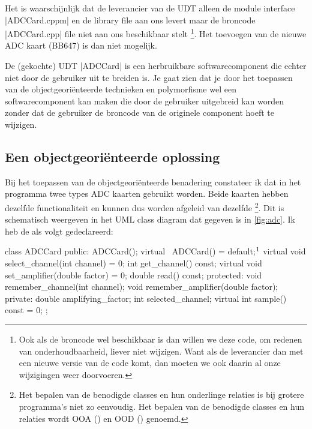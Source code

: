 \begin{cpplstShortInline}
Het is waarschijnlijk dat de leverancier van de UDT alleen de module interface |ADCCard.cppm| en de library file  aan ons levert maar de broncode |ADCCard.cpp| file niet aan ons beschikbaar stelt%
\footnote{%
    Ook als de broncode wel beschikbaar is dan willen we deze code, om redenen van onderhoudbaarheid, liever niet wijzigen.
    Want als de leverancier dan met een nieuwe versie van de code komt, dan moeten we ook daarin al onze wijzigingen weer doorvoeren.
}.
Het toevoegen van de nieuwe ADC kaart (BB647) is dan niet mogelijk.

De (gekochte) UDT |ADCCard| is een herbruikbare softwarecomponent die echter niet door de gebruiker uit te breiden is.
Je gaat zien dat je door het toepassen van de objectgeoriënteerde technieken  en polymorfisme wel een softwarecomponent kan maken die door de gebruiker uitgebreid kan worden zonder dat de gebruiker de broncode van de originele component hoeft te wijzigen.

\subsection{Een objectgeoriënteerde oplossing}
\label{sec:adcoo}
Bij het toepassen van de objectgeoriënteerde benadering constateer ik dat in het programma twee types ADC kaarten gebruikt worden.
Beide kaarten hebben dezelfde functionaliteit en kunnen dus worden afgeleid van dezelfde %
\footnote{%
    Het bepalen van de benodigde classes en hun onderlinge relaties is bij grotere programma's niet zo eenvoudig.
    Het bepalen van de benodigde classes en hun relaties wordt OOA () en OOD () genoemd.
}.
Dit is schematisch weergeven in het UML class diagram dat gegeven is in \cref{fig:adc}.
Ik heb de  als volgt gedeclareerd:

\begin{cpplstfragment}[mathescape=true]
class ADCCard {
public:
    ADCCard();
    virtual ~ADCCard() = default;$\footnotemark$
    virtual void select_channel(int channel) = 0;
    int get_channel() const;
    virtual void set_amplifier(double factor) = 0;
    double read() const;
protected:
    void remember_channel(int channel);
    void remember_amplifier(double factor);
private:
    double amplifying_factor;
    int selected_channel;
    virtual int sample() const = 0;
};
\end{cpplstfragment}


\end{cpplstShortInline}
